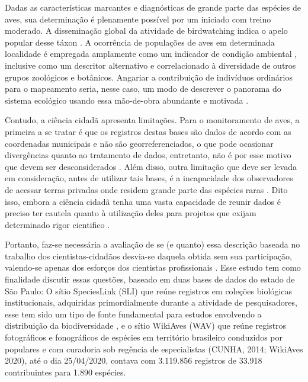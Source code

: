 Dadas as características marcantes e diagnósticas de grande parte das espécies de aves, sua determinação é plenamente possível por um iniciado com treino moderado. A disseminação global da atividade de birdwatching indica o apelo popular desse táxon \cite{Lepczyk2005,Alexandrino2018}. A ocorrência de populações de aves em determinada localidade é empregada amplamente como um indicador de condição ambiental \cite{Lepczyk2005,Greenwood2007,Schubert2019}, inclusive como um descritor alternativo e correlacionado à diversidade de outros grupos zoológicos e botânicos. Angariar a contribuição de indivíduos ordinários para o mapeamento seria, nesse caso, um modo de descrever o panorama do sistema ecológico usando essa mão-de-obra abundante e motivada \cite{Lepczyk2005,Klemann-Junior2017,Alexandrino2018}. 


Contudo, a ciência cidadã apresenta limitações. Para o monitoramento de aves, a primeira a se tratar é que os registros destas bases são dados de acordo com as coordenadas municipais e não são georreferenciados, o que pode ocasionar divergências quanto ao tratamento de dados, entretanto, não é por esse motivo que devem ser desconsiderados \cite{Neto2017}. Além disso, outra limitação que deve ser levada em consideração, antes de utilizar tais bases, é a incapacidade dos observadores de acessar terras privadas onde residem grande parte das espécies raras \cite{Lepczyk2005}. Dito isso, embora a ciência cidadã tenha uma vasta capacidade de reunir dados é preciso ter cautela quanto à utilização deles para projetos que exijam determinado rigor cientifico \cite{Kieslinger2019}.


Portanto, faz-se necessária a avaliação de se (e quanto) essa descrição baseada no trabalho dos cientistas-cidadãos desvia-se daquela obtida sem sua participação, valendo-se apenas dos esforços dos cientistas profissionais \cite{Klemann-Junior2017}. Esse estudo tem como finalidade discutir essas questões, baseado em duas bases de dados do estado de São Paulo: O sítio SpeciesLink (SLI) que reúne registros em coleções biológicas institucionais, adquiridas primordialmente durante a atividade de pesquisadores, esse tem sido um tipo de fonte fundamental para estudos envolvendo a distribuição da biodiversidade \cite{Horns2018}, e o sítio WikiAves (WAV) que reúne registros fotográficos e fonográficos de espécies em território brasileiro conduzidos por populares e com curadoria sob regência de especialistas (CUNHA, 2014; WikiAves 2020), até o dia 25/04/2020, contava com 3.119.856 registros de 33.918 contribuintes para 1.890 espécies.

